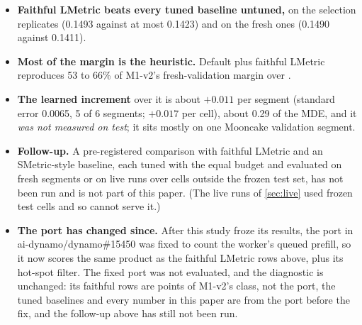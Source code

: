 \begin{itemize}
  \item \textbf{Faithful LMetric beats every tuned baseline untuned,} on the selection replicates
    (0.1493 against at most 0.1423) and on the fresh ones (0.1490 against 0.1411).
  \item \textbf{Most of the margin is the heuristic.} Default plus faithful LMetric reproduces 53 to
    66\% of M1-v2's fresh-validation margin over .
  \item \textbf{The learned increment} over it is about $+0.011$ per segment (standard error 0.0065,
    5 of 6 segments; $+0.017$ per cell), about 0.29 of the MDE, and it \emph{was not measured on
    test}; it sits mostly on one Mooncake validation segment.
  \item \textbf{Follow-up.} A pre-registered comparison with faithful LMetric and an SMetric-style
    baseline, each tuned with the equal budget and evaluated on fresh segments or on live runs over
    cells outside the frozen test set, has not been run and is not part of this paper.
    (The live runs of \cref{sec:live} used frozen test cells and so cannot serve it.)
  \item \textbf{The port has changed since.} After this study froze its results, the
     port in ai-dynamo/dynamo\#15450 was fixed to count the worker's queued prefill,
    so it now scores the same product as the faithful LMetric rows above, plus its hot-spot filter.
    The fixed port was not evaluated, and the diagnostic is unchanged: its faithful rows are points
    of M1-v2's class, not the port, the tuned baselines and every  number in this
    paper are from the port before the fix, and the follow-up above has still not been run.
\end{itemize}

